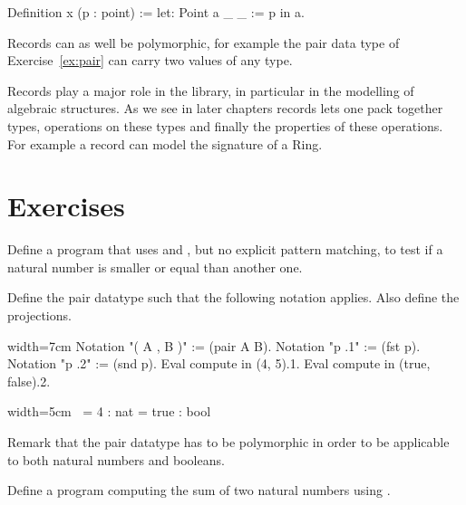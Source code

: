 \begin{coq}{}{}
Definition x (p : point) := let: Point a _ _ := p in a.
\end{coq}

Records can as well be polymorphic, for example the pair data type of
Exercise~\ref{ex:pair} can carry two values of any type.

Records play a major role in the \mcbMC{} library, in particular
in the modelling of algebraic structures.   As we see in later chapters
records lets one pack together types, operations on these types and
finally the properties of these operations.  For example a record
can model the signature of a Ring.

\newpage
\section{Exercises}

\begin{Exercise}[label=ex:leq,difficulty=0,title={Order with subtraction}]
Define a program  that uses  and , but no
explicit pattern matching, to test if a natural number is smaller
or equal than another one.
\end{Exercise}


\begin{Exercise}[label=ex:pair,difficulty=0,title={The pair datatype}]
Define the pair datatype such that the following notation
applies.  Also define the projections.

\begin{coq}{}{width=7cm}
Notation "( A , B )" := (pair A B).
Notation "p .1" := (fst p).
Notation "p .2" := (snd p).
Eval compute in (4, 5).1.
Eval compute in (true, false).2.
\end{coq}
\begin{coqout}{}{width=5cm}
$~$
     = 4 : nat
     = true : bool
\end{coqout}
Remark that the pair datatype has to be polymorphic in order to
be applicable to both natural numbers and booleans.
\end{Exercise}

\begin{Exercise}[label=ex:iteradd,difficulty=0,title={Addition with iteration}]
Define a program computing the sum of two natural numbers
using .
\end{Exercise}

